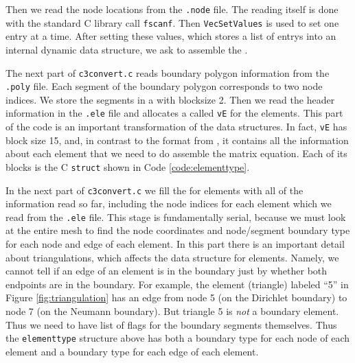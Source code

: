 Then we read the node locations from the \texttt{.node} file.  The reading itself is done with the standard C library call \texttt{fscanf}.  Then \texttt{VecSetValues} is used to set one entry at a time.  After setting these values, which stores a list of entrys into an internal \PETSc dynamic data structure, we ask \PETSc to assemble the \pVecs.

The next part of \texttt{c3convert.c} reads boundary polygon information from the \texttt{.poly} file.  Each segment of the boundary polygon corresponds to two node indices.  We store the segments in a \pVec with blocksize 2.  Then we read the header information in the \texttt{.ele} file and allocates a \pVec called \texttt{vE} for the elements.  This part of the code is an important transformation of the data structures.  In fact, \texttt{vE} has block size 15, and, in contrast to the format from \Triangle, it contains all the information about each element that we need to do assemble the matrix equation.  Each of its blocks is the C \texttt{struct} shown in Code \ref{code:elementtype}.


In the next part of \texttt{c3convert.c} we fill the \pVec for elements with all of the information read so far, including the node indices for each element which we read from the \texttt{.ele} file.  This stage is fundamentally serial, because we must look at the entire mesh to find the node coordinates and node/segment boundary type for each node and edge of each element.  In this part there is an important detail about triangulations, which affects the data structure for elements.  Namely, we cannot tell if an edge of an element is in the boundary just by whether both endpoints are in the boundary.  For example, the element (triangle) labeled ``5'' in Figure \ref{fig:triangulation} has an edge from node 5 (on the Dirichlet boundary) to node 7 (on the Neumann boundary).  But triangle 5 is \emph{not} a boundary element.  Thus we need to have list of flags for the boundary segments themselves.  Thus the \texttt{elementtype} structure above has both a boundary type for each node of each element and a boundary type for each edge of each element.

